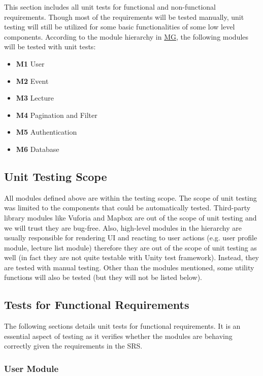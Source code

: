 \documentclass[12pt, titlepage]{article}
\begin{document}
This section includes all unit tests for functional and non-functional requirements. Though most of the requirements will be tested manually, unit testing will still be utilized for some basic functionalities of some low level components. According to the module hierarchy in \href{https://github.com/beatlepie/4G06CapstoneProjectTeam2/blob/main/docs/Design/SoftArchitecture/MG.pdf}{MG}, the following modules will be tested with unit tests:
\begin{itemize}
	\item \textbf{M1} User
	\item \textbf{M2} Event
	\item \textbf{M3} Lecture
	\item \textbf{M4} Pagination and Filter
	\item \textbf{M5} Authentication
	\item \textbf{M6} Database
\end{itemize}

\subsection{Unit Testing Scope}

All modules defined above are within the testing scope.  The scope of unit testing was limited to the components that could be automatically tested. Third-party library modules like Vuforia and Mapbox are out of the scope of unit testing and we will trust they are bug-free. Also, high-level modules in the hierarchy are usually responsible for rendering UI and reacting to user actions (e.g. user profile module, lecture list module) therefore they are out of the scope of unit testing as well (in fact they are not quite testable with Unity test framework). Instead, they are tested with manual testing. Other than the modules mentioned, some utility functions will also be tested (but they will not be listed below).

\subsection{Tests for Functional Requirements}

The following sections details unit tests for functional requirements. It is an essential aspect of testing as it verifies whether the modules are behaving
correctly given the requirements in the SRS.

\subsubsection{User Module}
\end{document}
